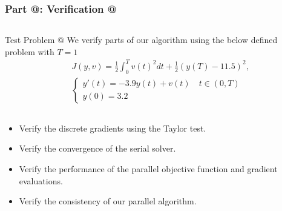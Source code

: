 \documentclass[9pt]{beamer}
\makeatletter
\newcommand*{\rom}[1]{\expandafter\@slowromancap\romannumeral #1@}
\makeatother
\begin{document}
\begin{frame}
\frametitle{\textbf{ Part \rom{5}:} Verification \rom{1}}
\begin{columns}
\begin{block}{Test Problem \rom{1}}
We verify parts of our algorithm using the below defined problem with $T=1$
{\small\begin{align*}
&J(y,v) = \frac{1}{2}\int_0^{T}v(t)^2dt + \frac{1}{2}(y(T)-11.5)^2, \\
&\left\{
     \begin{array}{lr}
       	y'(t)=-3.9y(t) + v(t) \quad t\in(0,T)\\
       	y(0)=3.2
     \end{array}
   \right. 
\end{align*}}
\end{block}
\end{columns}
\begin{itemize}
\item{Verify the discrete gradients using the Taylor test.}
\item{Verify the convergence of the serial solver.}
\item{Verify the performance of the parallel objective function and gradient evaluations.}
\item{Verify the consistency of our parallel algorithm.}
\end{itemize}
\end{frame}
\end{document}
